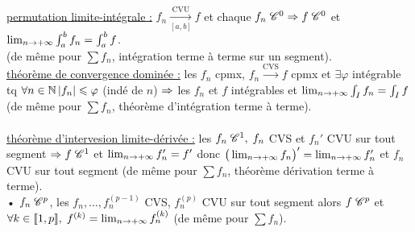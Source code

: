 \documentclass[12 pt]{exampleclass}
\begin{document}
\text{}\\
\underline{permutation limite-intégrale :} $f_n \underset{[a,b]}{\overset{\text{CVU}}{\to}} f$ et chaque $f_n \;\mathscr{C}^0 \Rightarrow f\; \mathscr{C}^0$ et $\lim_{n\to +\infty} \int_a^b f_n = \int_a^b f$.\\
(de même pour $\sum f_n$, intégration terme à terme sur un segment).\\
\underline{théorème de convergence dominée :} les $f_n$ cpmx, $f_n \overset{\text{CVS}}{\to} f$ cpmx et $\exists \varphi$ intégrable tq $\forall n\in\mathbb{N} \, |f_n|\leqslant \varphi$ (indé de $n$) $\Rightarrow$ les $f_n$ et $f$ intégrables et $\lim_{n\to +\infty} \int_I f_n = \int_I f$ \; (de même pour $\sum f_n$, théorème d'intégration terme à terme).\\
\text{}\\
\underline{théorème d'intervesion limite-dérivée :} les $f_n \; \mathscr{C}^1, \; f_n$ CVS et $f_n'$ CVU sur tout segment $\Rightarrow f \; \mathscr{C}^1$ et $\lim_{n\to +\infty} f_n' = f'$ donc $\big(\lim_{n\to +\infty} f_n\big)' = \lim_{n\to +\infty} f_n'$ et $f_n$ CVU sur tout segment (de même pour $\sum f_n$, théorème dérivation terme à terme).\\
• $f_n \; \mathscr{C}^p$, les $f_n,\dots,f_n^{(p-1)}$ CVS, $f_n^{(p)}$ CVU sur tout segment alors $f\; \mathscr{C}^p$ et $\forall k \in \llbracket 1,p \rrbracket, \; f^{(k)} = \lim_{n\to +\infty} f_n^{(k)}$ (de même pour $\sum f_n$).\\
\end{document}
